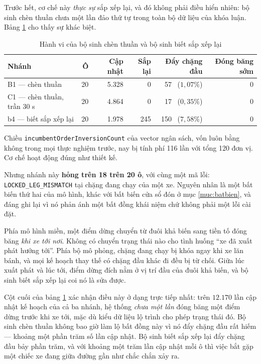 Trước hết, cơ chế này \emph{thực sự} sắp xếp lại, và đó không phải điều hiển nhiên: bộ sinh chèn
thuần chưa một lần đảo thứ tự trong toàn bộ dữ liệu của khóa luận. Bảng \ref{bang:sapxep} cho
thấy sự khác biệt.

\begin{table}[htbp]
\centering
\caption{Hành vi của bộ sinh chèn thuần và bộ sinh biết sắp xếp lại}
\label{bang:sapxep}
\small
\begin{tabular}{@{}lrrrrr@{}}
\toprule
\textbf{Nhánh} & \textbf{Ô} & \textbf{Cập nhật} & \textbf{Sắp lại} & \textbf{Đẩy chặng đầu} & \textbf{Đóng băng sớm}\\
\midrule
B1 --- chèn thuần & 20 & 5.328 & 0 & 57 \ ($1{,}07\%$) & 0\\
C1 --- chèn thuần, trần 30 s & 20 & 4.864 & 0 & 17 \ ($0{,}35\%$) & 0\\
b4 --- biết sắp xếp lại & 20 & 1.978 & 245 & 150 \ ($7{,}58\%$) & 0\\
\bottomrule
\end{tabular}
\end{table}

Chiều \texttt{incumbentOrderInversionCount} của vector ngân sách, vốn luôn bằng không trong mọi
thực nghiệm trước, nay bị tính phí 116 lần với tổng 120 đơn vị. Cơ chế hoạt động đúng như thiết
kế.

Nhưng nhánh này \textbf{hỏng trên 18 trên 20 ô}, với cùng một mã lỗi:
\texttt{LOCKED\_LEG\_MISMATCH} tại chặng đang chạy của một xe. Nguyên nhân là một bất biến thứ
hai của mô hình, khác với bất biến cửa sổ đón ở mục \ref{muc:batbien}, và đáng ghi lại vì nó
phản ánh một bất đồng khái niệm chứ không phải một lỗi cài đặt.

Phía mô hình miền, một điểm dừng chuyển từ đuôi khả biến sang tiền tố đóng băng \emph{khi xe
tới nơi}. Không có chuyển trạng thái nào cho tình huống ``xe đã xuất phát hướng tới''. Phía bộ
mô phỏng, chặng đang chạy bị khóa ngay khi xe lăn bánh, và mọi kế hoạch thay thế có chặng đầu
khác đi đều bị từ chối. Giữa lúc xuất phát và lúc tới, điểm dừng đích nằm ở vị trí đầu của đuôi
khả biến, và bộ sinh biết sắp xếp lại coi nó là sửa được.

Cột cuối của bảng \ref{bang:sapxep} xác nhận điều này ở dạng trực tiếp nhất: trên $12.170$ lần
cập nhật kế hoạch của cả ba nhánh, hệ thống \emph{chưa một lần} đóng băng một điểm dừng trước
khi xe tới, mặc dù kiểu dữ liệu lộ trình cho phép trạng thái đó. Bộ sinh chèn thuần không bao
giờ làm lộ bất đồng này vì nó đẩy chặng đầu rất hiếm --- khoảng một phần trăm số lần cập nhật.
Bộ sinh biết sắp xếp lại đẩy chặng đầu bảy phần trăm, và với khoảng một trăm lần cập nhật mỗi
ô thì việc bắt gặp một chiếc xe đang giữa đường gần như chắc chắn xảy ra.

